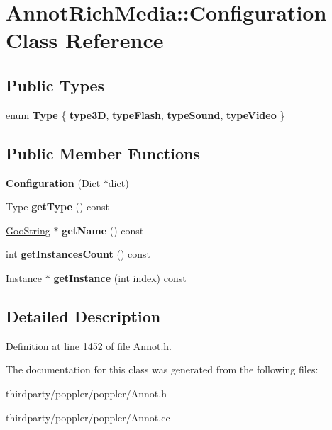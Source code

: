 \hypertarget{class_annot_rich_media_1_1_configuration}{}\section{Annot\+Rich\+Media\+:\+:Configuration Class Reference}
\label{class_annot_rich_media_1_1_configuration}
\subsection*{Public Types}
\begin{DoxyCompactItemize}
\item 
\mbox{\label{class_annot_rich_media_1_1_configuration_a86a96926fcf680d6cf6d37074b441e6e}} 
enum {\bfseries Type} \{ {\bfseries type3D}, 
{\bfseries type\+Flash}, 
{\bfseries type\+Sound}, 
{\bfseries type\+Video}
 \}
\end{DoxyCompactItemize}
\subsection*{Public Member Functions}
\begin{DoxyCompactItemize}
\item 
\mbox{\label{class_annot_rich_media_1_1_configuration_afb0eafb487a5db7686c2a8298f07d0d0}} 
{\bfseries Configuration} (\hyperlink{class_dict}{Dict} $\ast$dict)
\item 
\mbox{\label{class_annot_rich_media_1_1_configuration_a5c5f24249f3b66498ea0528f9e9fd554}} 
Type {\bfseries get\+Type} () const
\item 
\mbox{\label{class_annot_rich_media_1_1_configuration_ac8fd0570c96446d99ad7ea6bc2bc3335}} 
\hyperlink{class_goo_string}{Goo\+String} $\ast$ {\bfseries get\+Name} () const
\item 
\mbox{\label{class_annot_rich_media_1_1_configuration_ab9a832e51cbc89add359bb6cb9e81025}} 
int {\bfseries get\+Instances\+Count} () const
\item 
\mbox{\label{class_annot_rich_media_1_1_configuration_a987922292fbc90f73c17d838704cf13b}} 
\hyperlink{class_annot_rich_media_1_1_instance}{Instance} $\ast$ {\bfseries get\+Instance} (int index) const
\end{DoxyCompactItemize}


\subsection{Detailed Description}


Definition at line 1452 of file Annot.\+h.



The documentation for this class was generated from the following files\+:\begin{DoxyCompactItemize}
\item 
thirdparty/poppler/poppler/Annot.\+h\item 
thirdparty/poppler/poppler/Annot.\+cc\end{DoxyCompactItemize}

